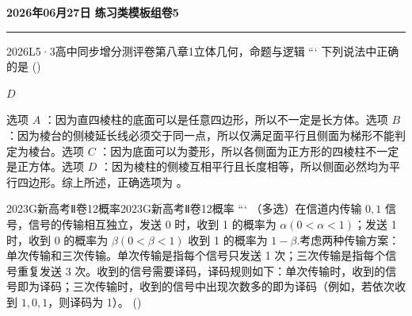 \documentclass[12pt,UTF-8,a4paper]{ctexart}
\newcommand{\mytitle}{}
\numberwithin{figure}{section}
\theoremstyle{mystyle}
\theoremstyle{mystylekaishu}
\theoremstyle{mystyle}
\numberwithin{xiti}{section}
\begin{document}
\thispagestyle{plain} %
\renewcommand{\mytitle}{2026年06月27日 练习类模板组卷5}

\begin{center}
  {\Huge\bfseries\color{structure} \mytitle}
  \vspace{0.5em}
  
  \textcolor{structure}{\rule{\linewidth}{1.5pt}}
\end{center}
\vspace{1em}


\begin{problem}{2026}{L}{5·3高中同步增分测评卷第八章}{1}{立体几何，命题与逻辑}
```
下列说法中正确的是 (\hspace{1cm})
\begin{choices}
\end{choices}
\end{problem}

\begin{answer}
$D$
\end{answer}

\begin{solutions}
选项 $A$ ：因为直四棱柱的底面可以是任意四边形，所以不一定是长方体。选项 $B$ ：因为棱台的侧棱延长线必须交于同一点，所以仅满足面平行且侧面为梯形不能判定为棱台。选项 $C$ ：因为底面可以为菱形，所以各侧面为正方形的四棱柱不一定是正方体。选项 $D$ ：因为棱柱的侧棱互相平行且长度相等，所以侧面必然均为平行四边形。综上所述，正确选项为 。
\end{solutions}


\begin{problem}{2023}{G}{新高考Ⅱ卷}{12}{概率}{2023}{G}{新高考Ⅱ卷}{12}{概率}
```
（多选）在信道内传输 $0,1$ 信号，信号的传输相互独立，发送 0 时，收到 1 的概率为 $\alpha(0<\alpha<1)$；发送 1 时，收到 0 的概率为 $\beta(0<\beta<1)$ 收到 1 的概率为 $1-\beta$.考虑两种传输方案：单次传输和三次传输。单次传输是指每个信号只发送 1 次；三次传输是指每个信号重复发送 3 次。收到的信号需要译码，译码规则如下：单次传输时，收到的信号即为译码；三次传输时，收到的信号中出现次数多的即为译码（例如，若依次收到 $1,0,1$，则译码为 1）。 (\hspace{1cm})
\begin{choices}
\end{choices}
\end{problem}
\end{document}
